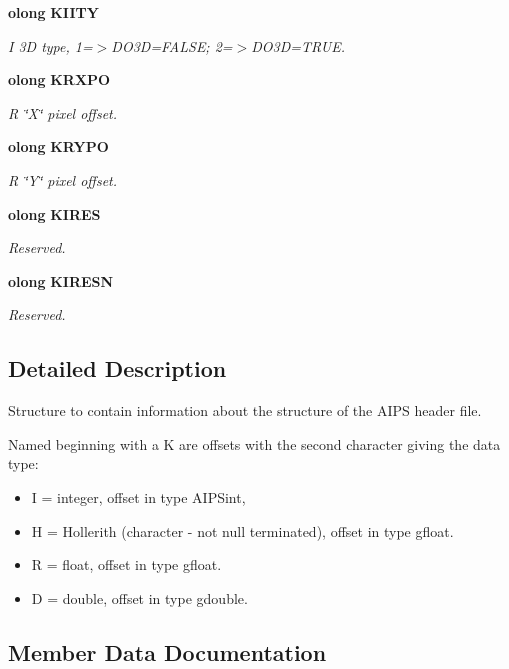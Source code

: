 \begin{CompactItemize}
{\bf olong} {\bf KIITY}
\begin{CompactList}\small\item\em I 3D type, 1=$>$DO3D=FALSE; 2=$>$DO3D=TRUE. \item\end{CompactList}\item 
{\bf olong} {\bf KRXPO}
\begin{CompactList}\small\item\em R \char`\"{}X\char`\"{} pixel offset. \item\end{CompactList}\item 
{\bf olong} {\bf KRYPO}
\begin{CompactList}\small\item\em R \char`\"{}Y\char`\"{} pixel offset. \item\end{CompactList}\item 
{\bf olong} {\bf KIRES}
\begin{CompactList}\small\item\em Reserved. \item\end{CompactList}\item 
{\bf olong} {\bf KIRESN}
\begin{CompactList}\small\item\em Reserved. \item\end{CompactList}\end{CompactItemize}


\subsection{Detailed Description}
Structure to contain information about the structure of the AIPS header file. 

Named beginning with a K are offsets with the second character giving the data type: \begin{itemize}
\item I = integer, offset in type AIPSint, \item H = Hollerith (character - not null terminated), offset in type gfloat. \item R = float, offset in type gfloat. \item D = double, offset in type gdouble. \end{itemize}




\subsection{Member Data Documentation}
